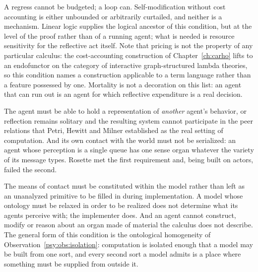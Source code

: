 \begin{requirement}[Priceable]
\label{psy:req:priced}
A regress cannot be budgeted; a loop can.
Self-modification without cost accounting is either unbounded or
arbitrarily curtailed, and neither is a mechanism.
Linear logic supplies the logical ancestor of this condition, but at
the level of the proof rather than of a running agent; what is
needed is resource sensitivity for the reflective act itself.
Note that pricing is not the property of any particular calculus:
the cost-accounting construction of Chapter~\ref{ch:carho} lifts to
an endofunctor on the category of interactive graph-structured
lambda theories, so this condition names a construction applicable
to a term language rather than a feature possessed by one.
Mortality is not a decoration on this list: an agent that can run
out is an agent for which reflective expenditure is a real decision.
\end{requirement}

\begin{requirement}
\label{psy:req:social}
The agent must be able to hold a representation of \emph{another}
agent's behavior, or reflection remains solitary and the resulting
system cannot participate in the peer relations that Petri, Hewitt
and Milner established as the real setting of computation.
And its own contact with the world must not be serialized: an agent
whose perception is a single queue has one sense organ whatever the
variety of its message types.
Rosette met the first requirement and, being built on actors, failed
the second.
\end{requirement}

\begin{requirement}
\label{psy:req:contact}
The means of contact must be constituted within the model rather
than left as an unanalyzed primitive to be filled in during
implementation.
A model whose ontology must be relaxed in order to be realized does
not determine what its agents perceive with; the implementer does.
And an agent cannot construct, modify or reason about an organ made
of material the calculus does not describe.
The general form of this condition is the ontological homogeneity of
Observation~\ref{psy:obs:isolation}: computation is isolated enough
that a model may be built from one sort, and every second sort a
model admits is a place where something must be supplied from
outside it.
\end{requirement}

